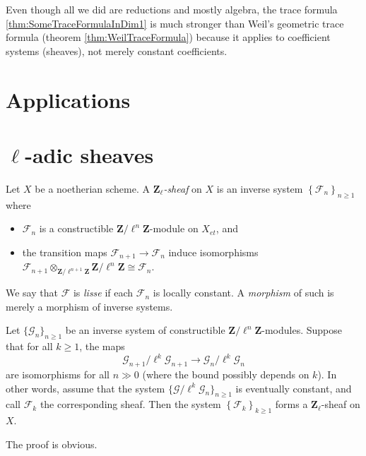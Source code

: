 \begin{remark}
Even though all we did are reductions and mostly algebra, the trace formula
\ref{thm:SomeTraceFormulaInDim1} is much stronger than Weil's geometric trace
formula (theorem \ref{thm:WeilTraceFormula}) because it applies to coefficient
systems (sheaves), not merely constant coefficients.
\end{remark}

\section{Applications}


\section{$\ell$-adic sheaves}

\begin{definition}
Let $X$ be a noetherian scheme. A {\it $\mathbf{Z}_\ell$-sheaf} on $X$ is an
inverse system $\left\{\mathcal{F}_n\right\}_{n\geq 1}$ where
\begin{itemize}
\item
$\mathcal{F}_n$ is a constructible $\mathbf{Z}/\ell^n\mathbf{Z}$-module on
$X_{et}$, and
\item
the transition maps $\mathcal{F}_{n+1}\to \mathcal{F}_n$ induce isomorphisms
$\mathcal{F}_{n+1}\otimes_{\mathbf{Z}/\ell^{n+1}\mathbf{Z}}
\mathbf{Z}/\ell^n\mathbf{Z} \cong \mathcal{F}_n$.
\end{itemize}
We say that $\mathcal{F}$ is {\it lisse} if each $\mathcal{F}_n$ is locally
constant. A {\it morphism} of such is merely a morphism of inverse systems.
\end{definition}

\begin{lemma} \label{lem:EventuallyCstInverseSystems}
Let $\{\mathcal{G}_n\}_{n\geq 1}$ be an inverse system of constructible
$\mathbf{Z}/\ell^n\mathbf{Z}$-modules. Suppose that for all $k\geq 1$, the maps
$$
\mathcal{G}_{n+1}/\ell^k \mathcal{G}_{n+1}\to \mathcal{G}_n /\ell^k
\mathcal{G}_n
$$
are isomorphisms for all $n\gg 0$ (where the bound possibly depends on $k$). In
other words, assume that the system $\{\mathcal{G}/\ell^k\mathcal{G}_n\}_{n\geq
1}$ is eventually constant, and call $\mathcal{F}_k$ the corresponding sheaf.
Then the system $\left\{\mathcal{F}_k\right\}_{k\geq 1}$ forms a
$\mathbf{Z}_\ell$-sheaf on $X$.
\end{lemma}

The proof is obvious.

